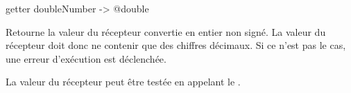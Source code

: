
\begin{galgasbox}
getter doubleNumber -> @double
\end{galgasbox}

Retourne la valeur du récepteur convertie en entier non signé. La valeur du récepteur doit donc ne contenir que des chiffres décimaux. Si ce n'est pas le cas, une erreur d'exécution est déclenchée.

La valeur du récepteur peut être testée en appelant le .

%





